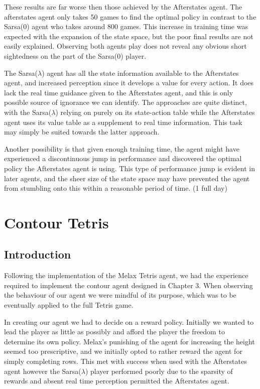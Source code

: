 \documentclass{rucsthesis}
\begin{document}
These results are far worse then those achieved by the Afterstates agent. The afterstates agent only takes 50 games to find the optimal policy in contrast to the Sarsa(0) agent who takes around 800 games. This increase in training time was expected with the expansion of the state space, but the poor final results are not easily explained. Observing both agents play does not reveal any obvious short sightedness on the part of the Sarsa(0) player.

The Sarsa($\lambda$) agent has all the state information available to the Afterstates agent, and increased perception since it develops a value for every action. It does lack the real time guidance given to the Afterstates agent, and this is only possible source of ignorance we can identify. The approaches are quite distinct, with the Sarsa($\lambda$) relying on purely on its state-action table while the Afterstates agent uses its value table as a supplement to real time information. This task may simply be suited towards the latter approach.

Another possibility is that given enough training time, the agent might have experienced a discontinuous jump in performance and discovered the optimal policy the Afterstates agent is using. This type of performance jump is evident in later agents, and the sheer size of the state space may have prevented the agent from stumbling onto this within a reasonable period of time. (1 full day)

\chapter{Contour Tetris}

\section{Introduction}

Following the implementation of the Melax Tetris agent, we had the experience required to implement the contour agent designed in Chapter 3. When observing the behaviour of our agent we were mindful of its purpose, which was to be eventually applied to the full Tetris game. 

In creating our agent we had to decide on a reward policy. Initially we wanted to lead the player as little as possibly and afford the player the freedom to determine its own policy. Melax's punishing of the agent for increasing the height seemed too prescriptive, and we initially opted to rather reward the agent for simply completing rows. This met with success when used with the Afterstates agent however the Sarsa($\lambda$) player performed poorly due to the sparsity of rewards and absent real time perception permitted the Afterstates agent.
\end{document}
